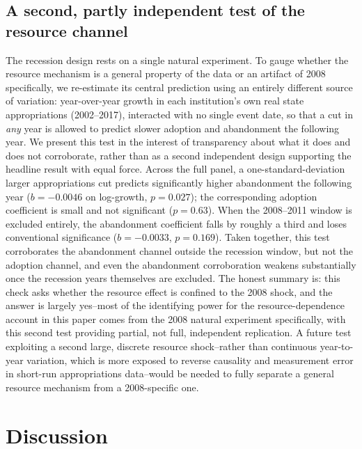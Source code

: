 \documentclass[11pt, letterpaper]{article}
\begin{document}
\subsection*{A second, partly independent test of the resource channel}

The recession design rests on a single natural experiment. To gauge whether the resource mechanism is a general property of the data or an artifact of 2008 specifically, we re-estimate its central prediction using an entirely different source of variation: year-over-year growth in each institution's own real state appropriations (2002--2017), interacted with no single event date, so that a cut in \emph{any} year is allowed to predict slower adoption and abandonment the following year. We present this test in the interest of transparency about what it does and does not corroborate, rather than as a second independent design supporting the headline result with equal force. Across the full panel, a one-standard-deviation larger appropriations cut predicts significantly higher abandonment the following year ($b=-0.0046$ on log-growth, $p=0.027$); the corresponding adoption coefficient is small and not significant ($p=0.63$). When the 2008--2011 window is excluded entirely, the abandonment coefficient falls by roughly a third and loses conventional significance ($b=-0.0033$, $p=0.169$). Taken together, this test corroborates the abandonment channel outside the recession window, but not the adoption channel, and even the abandonment corroboration weakens substantially once the recession years themselves are excluded. The honest summary is: this check asks whether the resource effect is confined to the 2008 shock, and the answer is largely yes--most of the identifying power for the resource-dependence account in this paper comes from the 2008 natural experiment specifically, with this second test providing partial, not full, independent replication. A future test exploiting a second large, discrete resource shock--rather than continuous year-to-year variation, which is more exposed to reverse causality and measurement error in short-run appropriations data--would be needed to fully separate a general resource mechanism from a 2008-specific one.

\section*{Discussion}
\end{document}
